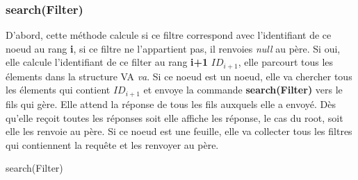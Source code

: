 \documentclass[a4paper,11pt]{report}
\begin{document}
\subsubsection{search(Filter)}
	D'abord, cette méthode calcule si ce filtre correspond avec l'identifiant de ce noeud au rang \textbf{i}, si ce filtre ne l'appartient pas, il renvoies \textit{null} au père. Si oui, elle calcule l'identifiant de ce filter au rang \textbf{i+1} $ID_{i+1}$, elle parcourt tous les élements dans la structure VA \textit{va}. Si ce noeud est un noeud, elle va chercher tous les élements qui contient $ID_{i+1}$ et envoye la commande \textbf{search(Filter)} vers le fils qui gère. Elle attend la réponse de tous les fils auxquels elle a envoyé. Dès qu'elle reçoit toutes les réponses soit elle affiche les réponse, le cas du root, soit elle les renvoie au père. Si ce noeud est une feuille, elle va collecter tous les filtres qui contiennent la requête et les renvoyer au père.

\begin{algorithme}
	search(Filter)
\end{algorithme}
\end{document}

